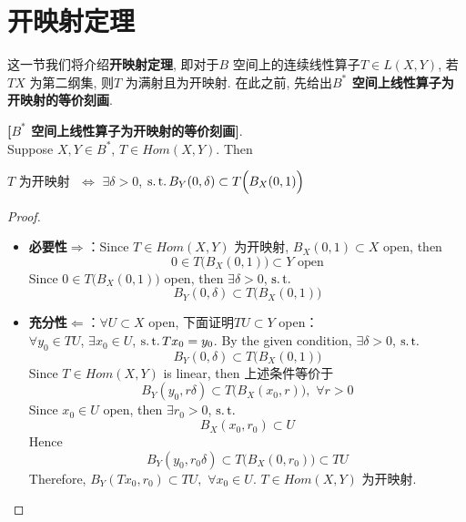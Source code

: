 \newpage

\section{开映射定理}
	这一节我们将介绍\textbf{开映射定理}, 即对于$B$ 空间上的连续线性算子$T \in L(X , Y)$, 若$TX$ 为第二纲集, 则$T$ 为满射且为开映射. 在此之前, 先给出\textbf{$B^*$ 空间上线性算子为开映射的等价刻画}. 
	
	\vspace*{1em}
	
	\begin{lemma}\label{lemma 4.5.1}
		\textbf{[$B^*$ 空间上线性算子为开映射的等价刻画]}. \\
		Suppose $X , Y \in B^*$, $T \in Hom(X , Y)$. Then
		\begin{center}
			$T$ 为开映射 $\,\, \Leftrightarrow \,\, \exists \delta > 0$, $\operatorname{s.t.} B_Y(0,  \delta) \subset T \Big( B_X(0 , 1) \Big)$
		\end{center}
		
		\vspace*{4em}
		
		\begin{proof}
			\begin{itemize}
				\item \textbf{必要性$\Rightarrow$}：Since $T \in Hom(X , Y)$ 为开映射, $B_{X}(0 , 1) \subset X$ open, then 
				\[ 0 \in T \Big( B_X(0 , 1) \Big) \subset Y \,\, \text{open} \]
				Since $0 \in T \Big( B_{X}(0 , 1) \Big)$ open, then $\exists \delta > 0$, $\operatorname{s.t.}$
				\[ B_Y(0 , \delta) \subset T \Big( B_X(0 , 1) \Big) \]
				
				\vspace*{6em}
				
				\item \textbf{充分性$\Leftarrow$}：$\forall U \subset X$ open, 下面证明$TU \subset Y$ open：\\
				$\forall y_0 \in TU$, $\exists x_0 \in U$, $\operatorname{s.t.} Tx_0 = y_0$. By the given condition, $\exists \delta > 0$, $\operatorname{s.t.}$
				\[ B_Y(0 , \delta) \subset T \Big( B_X(0 , 1) \Big) \]
				Since $T \in Hom(X , Y)$ is linear, then 上述条件等价于
				\[ B_Y(y_0 , r\delta) \subset T \Big( B_X(x_0 , r) \Big) , \,\, \forall r > 0 \]
				Since $x_0 \in U$ open, then $\exists r_0 > 0$, $\operatorname{s.t.}$
				\[ B_X(x_0 , r_0) \subset U \]
				Hence
				\[ B_Y(y_0 , r_0\delta) \subset T \Big( B_X(0 , r_0) \Big) \subset TU \]
				Therefore, $B_Y(Tx_0 , r_0) \subset TU , \,\, \forall x_0 \in U$. $T \in Hom(X , Y)$ 为开映射. 
			\end{itemize}
		\end{proof}
	\end{lemma}
	
